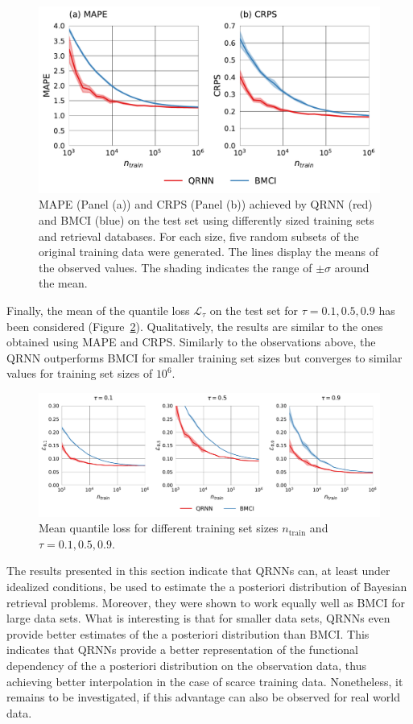 \documentclass[journal abbreviation, manuscript]{copernicus}
\begin{document}
  \begin{figure}[hbpt!]
    \includegraphics[width = 0.5\linewidth]{../plots/fig05}
    \caption{MAPE (Panel (a)) and CRPS (Panel (b)) achieved by QRNN (red) and BMCI (blue)
      on the test set using differently sized training sets and retrieval
    databases. For each size, five random subsets of the original training data were
    generated. The lines display the means of the observed values. The shading
    indicates the range of $\pm \sigma$ around the mean.}
    \label{fig:mape_crps}
  \end{figure}

Finally, the mean of the quantile loss $\mathcal{L}_\tau$ on the test set for
$\tau = 0.1, 0.5, 0.9$ has been considered (Figure~\ref{fig:quantile_losses}).
Qualitatively, the results are similar to the ones obtained using MAPE and CRPS.
Similarly to the observations above, the QRNN outperforms BMCI for smaller
 training set sizes but converges to similar values for training set sizes
 of $10^6$.

  \begin{figure}[hbpt!]
    \centering
    \includegraphics[width = 0.8\linewidth]{../plots/fig06}
    \caption{Mean quantile loss for different training set sizes $n_\text{train}$ and
    $\tau = 0.1, 0.5, 0.9$.}
    \label{fig:quantile_losses}
  \end{figure}

The results presented in this section indicate that QRNNs can, at least
under idealized conditions, be used to estimate the a posteriori distribution of 
Bayesian retrieval problems. Moreover, they were shown to work equally well
as BMCI for large data sets. What is interesting is that for smaller data sets,
QRNNs even provide better estimates of the a posteriori distribution than BMCI.
This indicates that QRNNs provide a better representation of the functional
dependency of the a posteriori distribution on the observation data, thus
achieving better interpolation in the case of scarce training data. Nonetheless,
 it remains to be investigated, if this advantage can also be observed for real
world data.
\end{document}
